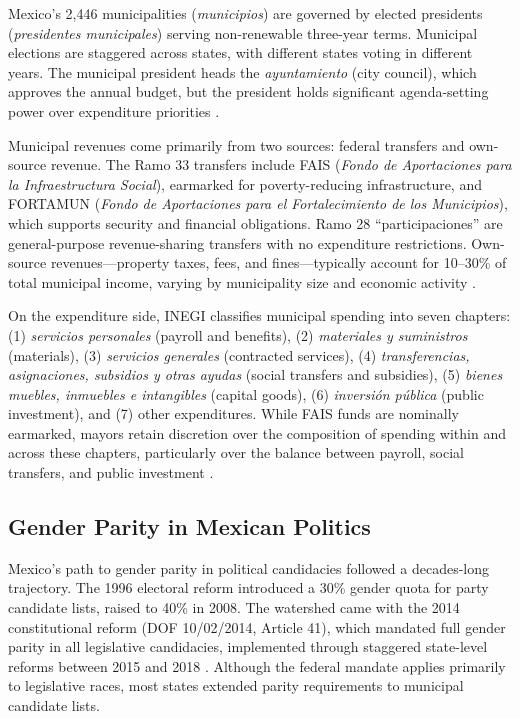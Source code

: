\documentclass[12pt]{article}
\begin{document}
Mexico's 2,446 municipalities (\textit{municipios}) are governed by elected presidents (\textit{presidentes municipales}) serving non-renewable three-year terms. Municipal elections are staggered across states, with different states voting in different years. The municipal president heads the \textit{ayuntamiento} (city council), which approves the annual budget, but the president holds significant agenda-setting power over expenditure priorities \citep{merino2007}.

Municipal revenues come primarily from two sources: federal transfers and own-source revenue. The Ramo 33 transfers include FAIS (\textit{Fondo de Aportaciones para la Infraestructura Social}), earmarked for poverty-reducing infrastructure, and FORTAMUN (\textit{Fondo de Aportaciones para el Fortalecimiento de los Municipios}), which supports security and financial obligations. Ramo 28 ``participaciones'' are general-purpose revenue-sharing transfers with no expenditure restrictions. Own-source revenues---property taxes, fees, and fines---typically account for 10--30\% of total municipal income, varying by municipality size and economic activity \citep{raich2004}.

On the expenditure side, INEGI classifies municipal spending into seven chapters: (1) \textit{servicios personales} (payroll and benefits), (2) \textit{materiales y suministros} (materials), (3) \textit{servicios generales} (contracted services), (4) \textit{transferencias, asignaciones, subsidios y otras ayudas} (social transfers and subsidies), (5) \textit{bienes muebles, inmuebles e intangibles} (capital goods), (6) \textit{inversi\'{o}n p\'{u}blica} (public investment), and (7) other expenditures. While FAIS funds are nominally earmarked, mayors retain discretion over the composition of spending within and across these chapters, particularly over the balance between payroll, social transfers, and public investment \citep{flamandmoreno2014}.

\subsection{Gender Parity in Mexican Politics}

Mexico's path to gender parity in political candidacies followed a decades-long trajectory. The 1996 electoral reform introduced a 30\% gender quota for party candidate lists, raised to 40\% in 2008. The watershed came with the 2014 constitutional reform (DOF 10/02/2014, Article 41), which mandated full gender parity in all legislative candidacies, implemented through staggered state-level reforms between 2015 and 2018 \citep{cerva2014}. Although the federal mandate applies primarily to legislative races, most states extended parity requirements to municipal candidate lists.
\end{document}
